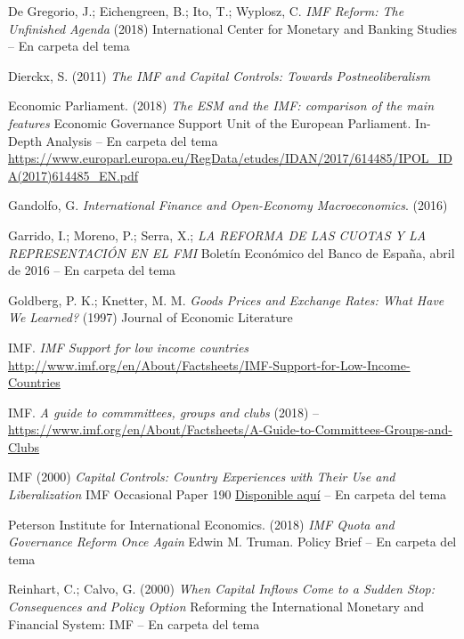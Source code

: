 \documentclass{nuevotema}
\begin{document}
De Gregorio, J.; Eichengreen, B.; Ito, T.; Wyplosz, C. \textit{IMF Reform: The Unfinished Agenda} (2018) International Center for Monetary and Banking Studies -- En carpeta del tema

Dierckx, S. (2011) \textit{The IMF and Capital Controls: Towards Postneoliberalism} 

Economic Parliament. (2018) \textit{The ESM and the IMF: comparison of the main features} Economic Governance Support Unit of the European Parliament. In-Depth Analysis -- En carpeta del tema \url{https://www.europarl.europa.eu/RegData/etudes/IDAN/2017/614485/IPOL_IDA(2017)614485_EN.pdf}

Gandolfo, G. \textit{International Finance and Open-Economy Macroeconomics}. (2016)

Garrido, I.; Moreno, P.; Serra, X.; \textit{LA REFORMA DE LAS CUOTAS Y LA REPRESENTACIÓN EN EL FMI} Boletín Económico del Banco de España, abril de 2016 -- En carpeta del tema

Goldberg, P. K.; Knetter, M. M. \textit{Goods Prices and Exchange Rates: What Have We Learned?} (1997) Journal of Economic Literature

IMF. \textit{IMF Support for low income countries} \url{http://www.imf.org/en/About/Factsheets/IMF-Support-for-Low-Income-Countries}

IMF. \textit{A guide to commmittees, groups and clubs} (2018) -- \url{https://www.imf.org/en/About/Factsheets/A-Guide-to-Committees-Groups-and-Clubs}

IMF (2000) \textit{Capital Controls: Country Experiences with Their Use and Liberalization} IMF Occasional Paper 190 \href{https://www.imf.org/external/pubs/ft/op/op190/index.htm}{Disponible aquí} -- En carpeta del tema

Peterson Institute for International Economics. (2018) \textit{IMF Quota and Governance Reform Once Again} Edwin M. Truman. Policy Brief -- En carpeta del tema

Reinhart, C.; Calvo, G. (2000) \textit{When Capital Inflows Come to a Sudden Stop: Consequences and Policy Option} Reforming the International Monetary and Financial System: IMF -- En carpeta del tema 
\end{document}
